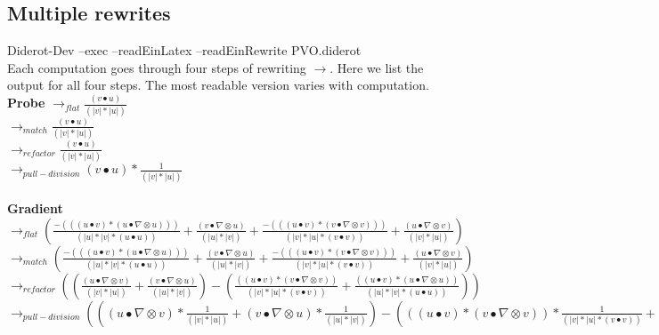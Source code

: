 \documentclass{article}
\begin{document}
\subsection{Multiple rewrites}
Diderot-Dev --exec --readEinLatex --readEinRewrite  PVO.diderot\\
    Each computation goes through four steps of rewriting  $\rightarrow$. Here we list the output for all four steps. The most readable version  varies with computation.\\
\textbf{Probe}
\newline $\rightarrow_{flat}\frac{(v \bullet u)}{(|v|*|u|)}$
\\\newline $\rightarrow_{match}\frac{(v \bullet u)}{(|v|*|u|)}$
\\\newline $\rightarrow_{refactor}\frac{(v \bullet u)}{(|v|*|u|)}$
\\\newline $\rightarrow_{pull-division}(v \bullet u)*\frac{1}{(|v|*|u|)}$\\
\\
\textbf{Gradient}
\newline $\rightarrow_{flat}(\frac{-(((u \bullet v)*(u \bullet  \nabla  \otimes u)))}{(|u|*|v|*(u \bullet u))}+\frac{(v \bullet  \nabla  \otimes u)}{(|u|*|v|)}+\frac{-(((u \bullet v)*(v \bullet  \nabla  \otimes v)))}{(|v|*|u|*(v \bullet v))}+\frac{(u \bullet  \nabla  \otimes v)}{(|v|*|u|)})$
\\\newline $\rightarrow_{match}(\frac{-(((u \bullet v)*(u \bullet  \nabla  \otimes u)))}{(|u|*|v|*(u \bullet u))}+\frac{(v \bullet  \nabla  \otimes u)}{(|u|*|v|)}+\frac{-(((u \bullet v)*(v \bullet  \nabla  \otimes v)))}{(|v|*|u|*(v \bullet v))}+\frac{(u \bullet  \nabla  \otimes v)}{(|v|*|u|)})$
\\\newline $\rightarrow_{refactor}((\frac{(u \bullet  \nabla  \otimes v)}{(|v|*|u|)}+\frac{(v \bullet  \nabla  \otimes u)}{(|u|*|v|)})-(\frac{((u \bullet v)*(v \bullet  \nabla  \otimes v))}{(|v|*|u|*(v \bullet v))}+\frac{((u \bullet v)*(u \bullet  \nabla  \otimes u))}{(|u|*|v|*(u \bullet u))}))$
\\\newline $\rightarrow_{pull-division}(((u \bullet  \nabla  \otimes v)*\frac{1}{(|v|*|u|)}+(v \bullet  \nabla  \otimes u)*\frac{1}{(|u|*|v|)})-(((u \bullet v)*(v \bullet  \nabla  \otimes v))*\frac{1}{(|v|*|u|*(v \bullet v))}+((u \bullet v)*(u \bullet  \nabla  \otimes u))*\frac{1}{(|u|*|v|*(u \bullet u))}))$\\
\end{document}
